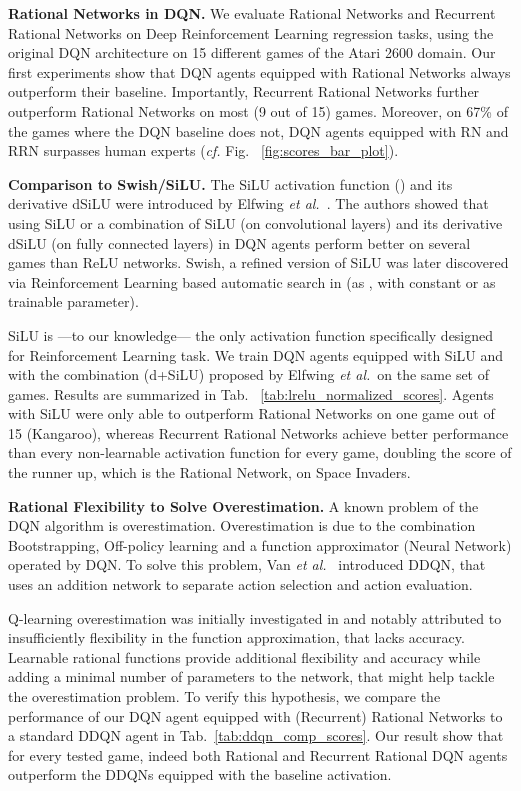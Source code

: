 \documentclass{article}
\newcommand{\etal}{\emph{et al.}~}
\begin{document}
\textbf{Rational Networks in DQN.}
We evaluate Rational Networks and Recurrent Rational Networks on Deep Reinforcement Learning regression tasks, using the original DQN architecture \cite{mnih2015human} on 15 different games of the Atari 2600 domain. 
Our first experiments show that DQN agents equipped with Rational Networks always outperform their baseline. Importantly, Recurrent Rational Networks further outperform Rational Networks on most (9 out of 15) games.
Moreover, on 67\% of the games where the DQN baseline does not, DQN agents equipped with RN and RRN surpasses human experts (\textit{cf.} Fig.~ \ref{fig:scores_bar_plot}).

\textbf{Comparison to Swish/SiLU.}
The SiLU activation function () and its derivative dSiLU were introduced by Elfwing \etal{}. The authors showed that using SiLU or a combination of SiLU (on convolutional layers) and its derivative dSiLU (on fully connected layers) in DQN agents perform better on several games than ReLU networks. Swish, a refined version of SiLU was later discovered via Reinforcement Learning based automatic search in \cite{ramachandran2017searching} (as , with  constant or as trainable parameter). 

SiLU is ---to our knowledge--- the only activation function specifically designed for Reinforcement Learning task. We train DQN agents equipped with SiLU and with the combination (d+SiLU) proposed by Elfwing \etal on the same set of games. Results are summarized in Tab.~ \ref{tab:lrelu_normalized_scores}. Agents with SiLU were only able to outperform Rational Networks on one game out of 15 (Kangaroo), whereas Recurrent Rational Networks achieve better performance than every non-learnable activation function for every game, doubling the score of the runner up, which is the Rational Network, on Space Invaders. 

\textbf{Rational Flexibility to Solve Overestimation.}
A known problem of the DQN algorithm is overestimation. Overestimation is due to the combination Bootstrapping, Off-policy learning and a function approximator (Neural Network) operated by DQN. To solve this problem, Van \etal{} introduced DDQN, that uses an addition network to separate action selection and action evaluation. 

Q-learning overestimation was initially investigated in \cite{thrun1993issues} and notably attributed to insufficiently flexibility in the function approximation, that lacks accuracy. Learnable rational functions provide additional flexibility and accuracy while adding a minimal number of parameters to the network, that might help tackle the overestimation problem. To verify this hypothesis, we compare the performance of our DQN agent equipped with (Recurrent) Rational Networks to a standard DDQN agent in Tab.~\ref{tab:ddqn_comp_scores}.
Our result show that for every tested game, indeed both Rational and Recurrent Rational DQN agents outperform the DDQNs equipped with the baseline activation.
\end{document}
